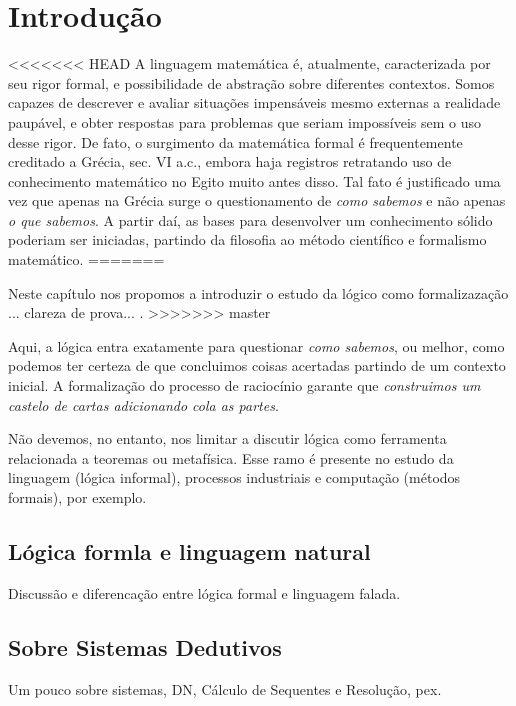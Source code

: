 \chapter{Introdução}
<<<<<<< HEAD
A linguagem matemática é, atualmente, caracterizada por seu rigor formal, e possibilidade de abstração sobre diferentes contextos. Somos capazes de descrever e avaliar situações impensáveis mesmo externas a realidade paupável, e obter respostas para problemas que seriam impossíveis sem o uso desse rigor. De fato, o surgimento da matemática formal é frequentemente creditado a Grécia, sec. VI a.c., embora haja registros retratando uso de conhecimento matemático no Egito muito antes disso. Tal fato é justificado uma vez que apenas na Grécia surge o questionamento de \textit{como sabemos} e não apenas \textit{o que sabemos}. A partir daí, as bases para desenvolver um conhecimento sólido poderiam ser iniciadas, partindo da filosofia ao método científico e formalismo matemático.
=======

Neste capítulo nos propomos a introduzir o estudo da lógico como formalizazação ... clareza de prova... \cite{enderton2001}.
>>>>>>> master

Aqui, a lógica entra exatamente para questionar \textit{como sabemos}, ou melhor, como podemos ter certeza de que concluimos coisas acertadas partindo de um contexto inicial. A formalização do processo de raciocínio garante que \textit{construimos um castelo de cartas adicionando cola as partes}.

Não devemos, no entanto, nos limitar a discutir lógica como ferramenta relacionada a teoremas ou metafísica. Esse ramo é presente no estudo da linguagem (lógica informal), processos industriais e computação (métodos formais), por exemplo. %

\section{Lógica formla e linguagem natural}
Discussão e diferencação entre lógica formal e linguagem falada.

\section{Sobre Sistemas Dedutivos}
Um pouco sobre sistemas, DN, Cálculo de Sequentes e Resolução, pex.

